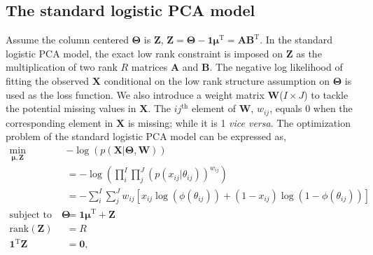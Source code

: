 \subsection{The standard logistic PCA model}
Assume the column centered $\mathbf{\Theta}$ is $\mathbf{Z}$, $\mathbf{Z} = \mathbf{\Theta} - \mathbf{1}\bm{\mu}^{\text{T}} = \mathbf{AB}^{\text{T}}$. In the standard logistic PCA model, the exact low rank constraint is imposed on $\mathbf{Z}$ as the multiplication of two rank $R$ matrices $\mathbf{A}$ and $\mathbf{B}$. The negative log likelihood of fitting the observed $\mathbf{X}$ conditional on the low rank structure assumption on $\mathbf{\Theta}$ is used as the loss function. We also introduce a weight matrix $\mathbf{W}$($I \times J$) to tackle the potential missing values in $\mathbf{X}$. The $ij^{\text{th}}$ element of $\mathbf{W}$, $w_{ij}$, equals 0 when the corresponding element in $\mathbf{X}$ is missing; while it is 1 \textit{vice versa}. The optimization problem of the standard logistic PCA model can be expressed as,
\begin{equation}\label{chapter3_eq:1}
\begin{aligned}
\min_{\bm{\mu}, \mathbf{Z}} \quad & -\log(p(\mathbf{X}|\mathbf{\Theta},\mathbf{W}))\\
               &= -\log(\prod_{i}^{I}\prod_{j}^{J} (p(x_{ij}|\theta_{ij}))^{w_{ij}})\\
               &= -\sum_{i}^{I}\sum_{j}^{J} w_{ij} \left[x_{ij}\log(\phi(\theta_{ij})) + (1-x_{ij})\log(1-\phi(\theta_{ij}))\right] \\
           \text{subject to} \quad   \mathbf{\Theta} &= \mathbf{1}\bm{\mu}^{\text{T}} + \mathbf{Z}\\
                               \text{rank}(\mathbf{Z}) &= R \\
                               \mathbf{1}^{\text{T}}\mathbf{Z} &= \mathbf{0},
\end{aligned}
\end{equation}
